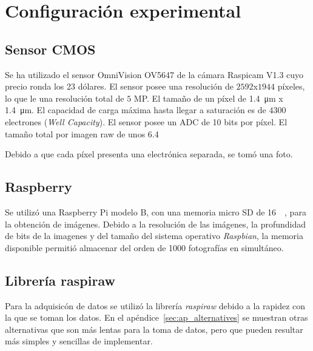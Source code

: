 \documentclass[twoside,twocolumn]{article}
\begin{document}
  \section{Configuración experimental}\label{sec:conf_exp}

    \subsection{Sensor CMOS}\label{sec:conf_exp:CMOS}
      Se ha utilizado el sensor OmniVision OV5647 de la cámara Raspicam V1.3 cuyo precio ronda los 23 dólares.
      El sensor posee una resolución de	$2592$x$1944$ píxeles, lo que le una resolución total de $5$ MP.
      El tamaño de un píxel de \SI{1.4}{\micro\meter} x \SI{1.4}{\micro\meter}.
      El capacidad de carga máxima hasta llegar a saturación es de $4300$ electrones (\emph{Well Capacity}).
      El sensor posee un ADC de 10 bits por píxel.
      El tamaño total por imagen raw de unos \SI{6.4}{\mega\byte}

      Debido a que cada píxel presenta una electrónica separada, se tomó una foto.

    \subsection{Raspberry}\label{sec:conf_exp:raspberry}
      Se utilizó una Raspberry Pi modelo B, con una memoria micro SD de \SI{16}{\giga\byte}, para la obtención de imágenes.
      Debido a la resolución de las imágenes, la profundidad de bits de la imagenes y del tamaño del sistema operativo \emph{Raspbian}, 
      la memoria disponible permitió almacenar del orden de 1000 fotografías en simultáneo.

    \subsection{Librería raspiraw}\label{sec:conf_exp:raspiraw}
      Para la adquisicón de datos se utilizó la librería {\it raspiraw}\cite{raspiraw} debido a la rapidez con la que se toman los datos.
      En el apéndice~\ref{sec:ap_alternatives} se muestran otras alternativas que son más lentas para la toma de datos,
      pero que pueden resultar más simples y sencillas de implementar.
\end{document}
